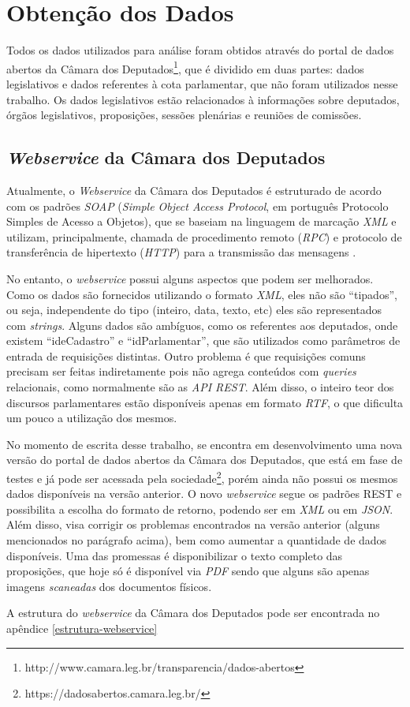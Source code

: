 \section{Obtenção dos Dados}
\label{obtencao-dados}

Todos os dados utilizados para análise foram obtidos através do portal de dados abertos da Câmara dos Deputados\footnote{http://www.camara.leg.br/transparencia/dados-abertos}, que é dividido em duas partes: dados legislativos e dados referentes à cota parlamentar, que não foram utilizados nesse trabalho. Os dados legislativos estão relacionados à informações sobre deputados, órgãos legislativos, proposições, sessões plenárias e reuniões de comissões.

\subsection{\textit{Webservice} da Câmara dos Deputados}

Atualmente, o \textit{Webservice} da Câmara dos Deputados é estruturado de acordo com os padrões \textit{SOAP} (\textit{Simple Object Access Protocol}, em português Protocolo Simples de Acesso a Objetos), que se baseiam na linguagem de marcação \textit{XML} e utilizam, principalmente, chamada de procedimento remoto (\textit{RPC}) e protocolo de transferência de hipertexto (\textit{HTTP}) para a transmissão das mensagens \cite{soap2007}.


No entanto, o \textit{webservice} possui alguns aspectos que podem ser melhorados. Como os dados são fornecidos utilizando o formato \textit{XML}, eles não são ``tipados'', ou seja, independente do tipo (inteiro, data, texto, etc) eles são representados com \textit{strings}. Alguns dados são ambíguos, como os referentes aos deputados, onde existem ``ideCadastro'' e ``idParlamentar'', que são utilizados como parâmetros de entrada de requisições distintas. Outro problema é que requisições comuns precisam ser feitas indiretamente pois não agrega conteúdos com \textit{queries} relacionais, como normalmente são as \textit{API REST}. Além disso, o inteiro teor dos discursos parlamentares estão disponíveis apenas em formato \textit{RTF}, o que dificulta um pouco a utilização dos mesmos.

No momento de escrita desse trabalho, se encontra em desenvolvimento uma nova versão do portal de dados abertos da Câmara dos Deputados, que está em fase de testes e já pode ser acessada pela sociedade\footnote{https://dadosabertos.camara.leg.br/}, porém ainda não possui os mesmos dados disponíveis na versão anterior. O novo \textit{webservice} segue os padrões REST e possibilita a escolha do formato de retorno, podendo ser em \textit{XML} ou em  \textit{JSON}. Além disso, visa corrigir os problemas encontrados na versão anterior (alguns mencionados no parágrafo acima), bem como aumentar a quantidade de dados disponíveis. Uma das promessas é disponibilizar o texto completo das proposições, que hoje só é disponível via \textit{PDF} sendo que alguns são apenas imagens \textit{scaneadas} dos documentos físicos.

A estrutura do \textit{webservice} da Câmara dos Deputados pode ser encontrada no apêndice \ref{estrutura-webservice}
